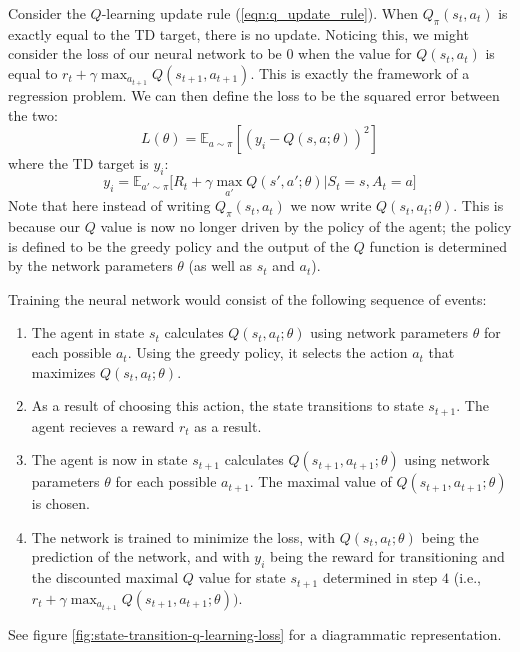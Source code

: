 \documentclass[journal, onecolumn, 12pt, draftclsnofoot]{IEEEtran}
\numberwithin{equation}{section}
\begin{document}
		\par Consider the $Q$-learning update rule (\ref{eqn:q_update_rule}). When $Q_\pi(s_t, a_t)$ is exactly equal to the TD target, there is no update. Noticing this, we might consider the loss of our neural network to be 0 when the value for $Q(s_t, a_t)$ is equal to $r_t + \gamma \max_{a_{t+1}} Q(s_{t+1}, a_{t+1})$. This is exactly the framework of a regression problem. We can then define the loss to be the squared error between the two:
		\begin{equation}
			\label{eqn:q_loss_no_target_network}
			L(\theta) = \mathbb{E}_{a \sim \pi}[(y_i - Q(s, a; \theta))^2]
		\end{equation}
		where the TD target is $y_i$:
		\begin{equation}
			\label{eqn:y_i_no_target_network}
			y_i = \mathbb{E}_{a' \sim \pi} \big[ R_t + \gamma \max_{a'}Q(s', a'; \theta) \vert S_t = s, A_t = a \big]
		\end{equation}
		Note that here instead of writing $Q_\pi(s_t, a_t)$ we now write $Q(s_t, a_t; \theta)$. This is because our $Q$ value is now no longer driven by the policy of the agent; the policy is defined to be the greedy policy and the output of the $Q$ function is determined by the network parameters $\theta$ (as well as $s_t$ and $a_t$).

		\par Training the neural network would consist of the following sequence of events:
		\begin{enumerate}
			\item The agent in state $s_t$ calculates $Q(s_t, a_t; \theta)$ using network parameters $\theta$ for each possible $a_t$. Using the greedy policy, it selects the action $a_t$ that maximizes $Q(s_t, a_t; \theta)$.
			\item As a result of choosing this action, the state transitions to state $s_{t+1}$. The agent recieves a reward $r_t$ as a result.
			\item The agent is now in state $s_{t+1}$ calculates $Q(s_{t+1}, a_{t+1}; \theta)$ using network parameters $\theta$ for each possible $a_{t+1}$. The maximal value of $Q(s_{t+1}, a_{t+1}; \theta)$ is chosen.
			\item The network is trained to minimize the loss, with $Q(s_t, a_t; \theta)$ being the prediction of the network, and with $y_i$ being the reward for transitioning and the discounted maximal $Q$ value for state $s_{t+1}$ determined in step $4$ (i.e., $r_t + \gamma \max_{a_{t+1}}Q(s_{t+1}, a_{t+1}; \theta))$.
		\end{enumerate}
		See figure \ref{fig:state-transition-q-learning-loss} for a diagrammatic representation.
\end{document}
